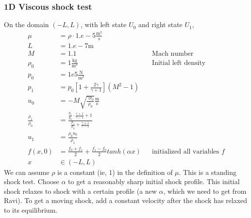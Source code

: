 \documentclass[10pt]{article}
\begin{document}
\subsubsection*{1D Viscous shock test}
On the domain $(-L,L)$, with left state $U_0$ and right state $U_1$, 
\begin{equation}
\begin{aligned}
\mu&=  \rho \cdot 1.e-5 \mathrm{\frac{m^2}{s}} \\
L&=1.e-7 \mathrm{m} \\
M &= 1.1                                                                            && \text{Mach number}  \\
\rho_0 &= 1 \mathrm{\frac{kg}{m^3}}                                 && \text{Initial left density}\\
p_0 &= 1e5 \mathrm{\frac{N}{m^2}}\\
p_1 &= p_0 \left [ 1+\frac{2\gamma}{\gamma+1} \right ] \left ( M^2 - 1 \right )  \\
u_0 &= -M\sqrt{\frac{\gamma p_0}{\rho_0}} \mathrm{\frac{m}{s}} \\
\frac{\rho_1}{\rho_0} &= \frac{\frac{p_1}{p_0} \cdot \frac{\gamma +1}{\gamma -1} + 1}{\frac{p_1}{p_0}+  \frac{\gamma +1}{\gamma -1}} \\
u_1&=\frac{\rho_0 u_0}{\rho_1} \\
f(x,0) &= \frac{f_0+f_1}{2}+ \frac{f_1-f_0}{2}tanh(\alpha x) && \text{initialized all variables $f$} \\
x &\in \left ( -L,L \right )
\end{aligned}
\end{equation}
We can assume $\rho$ is a constant (ie, 1) in the definition of $\mu$.
This is a standing shock test.
Choose $\alpha$ to get a reasonably sharp initial shock profile.
This initial shock relaxes to shock with a certain profile (a new $\alpha$, which we need to get from Ravi).
To get a moving shock, add a constant velocity after the shock has relaxed to its equilibrium.


\end{document}
